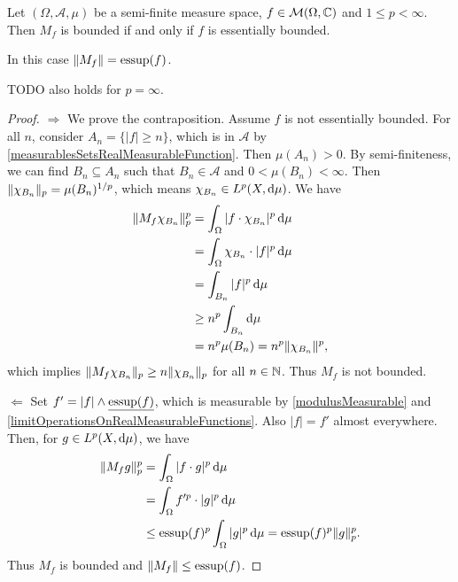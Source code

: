 \begin{proposition} \label{boundedMultiplicationOperator}
Let $(\Omega, \mathcal{A}, \mu)$ be a semi-finite measure space, $f\in \operatorname{\mathcal{M}}(\Omega, \mathbb{C})$ and $1\leq p < \infty$. Then $M_f$ is bounded \textup{if and only if} $f$ is essentially bounded.

In this case $\lVert M_f\rVert = \operatorname{essup}(f)$.
\end{proposition}
TODO also holds for $p = \infty$.
\begin{proof}
$\boxed{\Rightarrow}$ We prove the contraposition. Assume $f$ is not essentially bounded. For all $n$, consider $A_n = \{|f| \geq n\}$, which is in $\mathcal{A}$ by \ref{measurablesSetsRealMeasurableFunction}. Then $\mu(A_n) > 0$. By semi-finiteness, we can find $B_n\subseteq A_n$ such that $B_n\in \mathcal{A}$ and $0 < \mu(B_n)< \infty$. Then $\lVert\chi_{B_n}\rVert_p = \mu(B_n)^{1/p}$, which means $\chi_{B_n}\in L^p(X, \operatorname{d \!}{\mu})$. We have
\begin{align*}
\lVert M_f\chi_{B_n}\rVert_p^p &= \int_\Omega |f\cdot \chi_{B_n}|^{p}\operatorname{d \!}{\mu} \\
&= \int_\Omega \chi_{B_n}\cdot|f|^p\operatorname{d \!}{\mu} \\
&= \int_{B_n}|f|^p\operatorname{d \!}{\mu} \\
&\geq n^p\int_{B_n}\operatorname{d \!}{\mu} \\
&= n^p\mu(B_n) = n^p\lVert\chi_{B_n}\rVert^p,
\end{align*}
which implies $\lVert M_f\chi_{B_n}\rVert_p \geq n\lVert\chi_{B_n}\rVert_p$ for all $n\in \mathbb{N}$. Thus $M_f$ is not bounded.

$\boxed{\Leftarrow}$ Set $f' = |f| \wedge \underline{\operatorname{essup}(f)}$, which is measurable by \ref{modulusMeasurable} and \ref{limitOperationsOnRealMeasurableFunctions}. Also $|f| = f'$ almost everywhere. Then, for $g\in L^p(X, \operatorname{d \!}{\mu})$, we have
\begin{align*}
\lVert M_fg\rVert_p^p &= \int_\Omega |f\cdot g|^p \operatorname{d \!}{\mu} \\
&= \int_\Omega f'^p\cdot |g|^p \operatorname{d \!}{\mu} \\
&\leq \operatorname{essup}(f)^p\int_\Omega |g|^p \operatorname{d \!}{\mu} = \operatorname{essup}(f)^p\lVert g\rVert_p^p.
\end{align*}
Thus $M_f$ is bounded and $\lVert M_f\rVert \leq \operatorname{essup}(f)$.


\end{proof}

